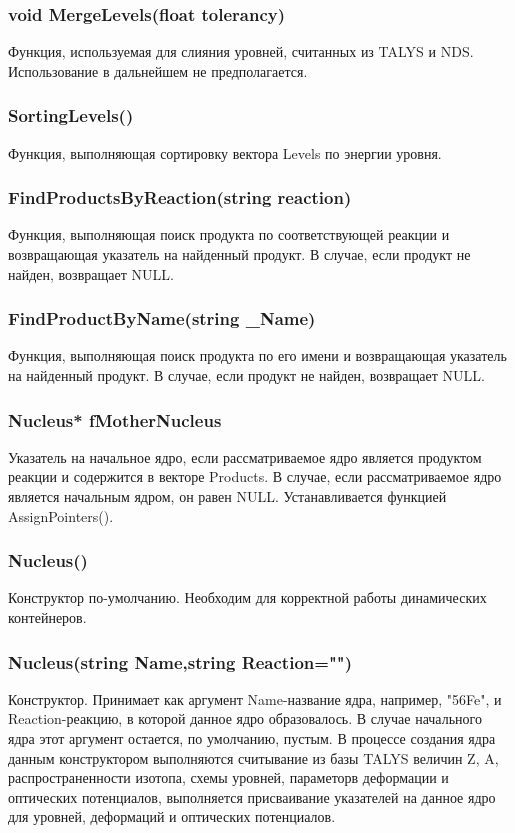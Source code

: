 \documentclass[a4paper,12pt]{extarticle}
\begin{document}
\subsubsection{void MergeLevels(float tolerancy)}
Функция, используемая для слияния уровней, считанных из TALYS и NDS. Использование в дальнейшем не предполагается.
\subsubsection{SortingLevels()}
Функция, выполняющая сортировку вектора Levels по энергии уровня. 
\subsubsection{FindProductsByReaction(string reaction)}
Функция, выполняющая поиск продукта по соответствующей реакции и возвращающая указатель на найденный продукт. В случае, если продукт не найден, возвращает NULL.
\subsubsection{FindProductByName(string _Name)}
Функция, выполняющая поиск продукта по его имени и возвращающая указатель на найденный продукт. В случае, если продукт не найден, возвращает NULL.
\subsubsection{Nucleus* fMotherNucleus}
Указатель на начальное ядро, если рассматриваемое ядро является продуктом реакции и содержится в векторе Products. В случае, если рассматриваемое ядро является начальным ядром, он равен NULL. Устанавливается функцией AssignPointers().
\subsubsection{Nucleus()}
Конструктор по-умолчанию. Необходим для корректной работы динамических контейнеров.
\subsubsection{Nucleus(string Name,string Reaction="")}
Конструктор. Принимает как аргумент Name-название ядра, например, "56Fe",  и Reaction-реакцию, в которой данное ядро образовалось. В случае начального ядра этот аргумент остается, по умолчанию, пустым. В процессе создания ядра данным конструктором выполняются считывание из базы TALYS величин Z, A, распространенности изотопа, схемы уровней, параметорв деформации и оптических потенциалов, выполняется присваивание указателей на данное ядро для уровней, деформаций и оптических потенциалов.
\end{document}
